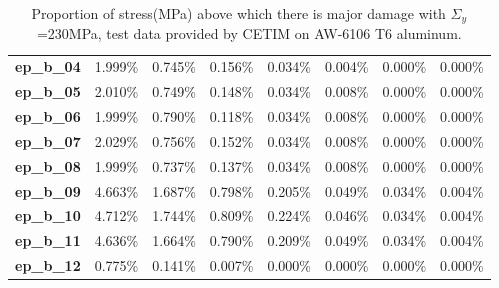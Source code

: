 \documentclass[3p,times,number,review]{elsarticle}
\begin{document}
\begin{table}[!h]
\begin{tabular}{llllllll}
\textbf{ep\_b\_04}           & 1.999\%        & 0.745\%        & 0.156\%        & 0.034\%         & 0.004\%         & 0.000\%         & 0.000\%         \\
\textbf{ep\_b\_05}           & 2.010\%        & 0.749\%        & 0.148\%        & 0.034\%         & 0.008\%         & 0.000\%         & 0.000\%         \\
\textbf{ep\_b\_06}           & 1.999\%        & 0.790\%        & 0.118\%        & 0.034\%         & 0.008\%         & 0.000\%         & 0.000\%         \\
\textbf{ep\_b\_07}           & 2.029\%        & 0.756\%        & 0.152\%        & 0.034\%         & 0.008\%         & 0.000\%         & 0.000\%         \\
\textbf{ep\_b\_08}           & 1.999\%        & 0.737\%        & 0.137\%        & 0.034\%         & 0.008\%         & 0.000\%         & 0.000\%         \\
\textbf{ep\_b\_09}           & 4.663\%        & 1.687\%        & 0.798\%        & 0.205\%         & 0.049\%         & 0.034\%         & 0.004\%         \\
\textbf{ep\_b\_10}           & 4.712\%        & 1.744\%        & 0.809\%        & 0.224\%         & 0.046\%         & 0.034\%         & 0.004\%         \\
\textbf{ep\_b\_11}           & 4.636\%        & 1.664\%        & 0.790\%        & 0.209\%         & 0.049\%         & 0.034\%         & 0.004\%         \\
\textbf{ep\_b\_12}           & 0.775\%        & 0.141\%        & 0.007\%        & 0.000\%         & 0.000\%         & 0.000\%         & 0.000\%         \\ \hline
\end{tabular}
\caption{Proportion of stress(MPa) above which there is major damage with $\Sigma_y$=230MPa, test data provided by CETIM on AW-6106 T6 aluminum.}
\label{tab.majordamage}
\end{table}
\end{document}
